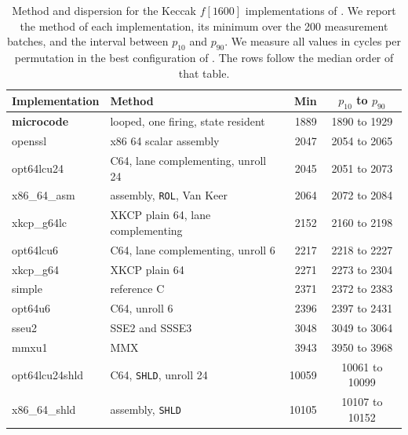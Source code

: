 \documentclass[journal=tches,submission]{iacrtrans}
\begin{document}
\begin{table}[htbp]
\centering
\caption{Method and dispersion for the Keccak $f[1600]$ implementations of
. We report the method of each implementation, its
minimum over the 200 measurement batches, and the interval between $p_{10}$ and
$p_{90}$. We measure all values in cycles per permutation in the best
configuration of . The rows follow the median order of
that table.}
\label{tab:res-keccak-dispersion}
\footnotesize
\setlength{\tabcolsep}{4pt}
\begin{tabular}{@{}llrc@{}}
\toprule
Implementation & Method & Min & $p_{10}$ to $p_{90}$ \\
\midrule
\textbf{microcode} & looped, one firing, state resident & 1889 & 1890 to 1929 \\
\midrule
openssl           & x86 64 scalar assembly             & 2047 & 2054 to 2065 \\
opt64lcu24        & C64, lane complementing, unroll 24 & 2045 & 2051 to 2073 \\
x86\_64\_asm      & assembly, \texttt{ROL}, Van Keer   & 2064 & 2072 to 2084 \\
xkcp\_g64lc       & XKCP plain 64, lane complementing  & 2152 & 2160 to 2198 \\
opt64lcu6         & C64, lane complementing, unroll 6  & 2217 & 2218 to 2227 \\
xkcp\_g64         & XKCP plain 64                      & 2271 & 2273 to 2304 \\
simple            & reference C                        & 2371 & 2372 to 2383 \\
opt64u6           & C64, unroll 6                      & 2396 & 2397 to 2431 \\
sseu2             & SSE2 and SSSE3                     & 3048 & 3049 to 3064 \\
mmxu1             & MMX                                & 3943 & 3950 to 3968 \\
opt64lcu24shld    & C64, \texttt{SHLD}, unroll 24      & 10059 & 10061 to 10099 \\
x86\_64\_shld     & assembly, \texttt{SHLD}            & 10105 & 10107 to 10152 \\
\bottomrule
\end{tabular}
\end{table}



\end{document}
